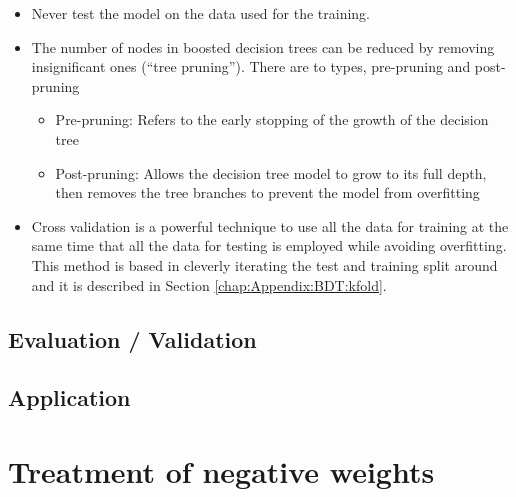 \begin{itemize}
	\item Never test the model on the data used for the training.
	\item The number of nodes in boosted decision trees can be reduced by removing 
		insignificant ones (``tree pruning''). There are to types, pre-pruning and post-pruning
		\begin{itemize}
			\item Pre-pruning: Refers to the early stopping of the growth of the decision tree
			\item Post-pruning: Allows the decision tree model to grow to its full depth, then removes 
				the tree branches to prevent the model from overfitting
		\end{itemize}
	\item Cross validation is a powerful technique to use all the data for training at the same 
		time that all the data for testing is employed while avoiding overfitting. This method is
		based in cleverly iterating the test and training split around and it is described in 
		Section \ref{chap:Appendix:BDT:kfold}.
\end{itemize}






\subsection{Evaluation / Validation}




\subsection{Application}

\section{Treatment of negative weights}
\label{chap:Appendix:BDT:NegWeigts}

